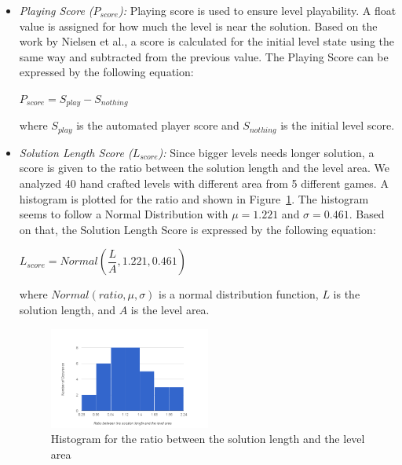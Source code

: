 \documentclass[letterpaper]{article}
\newcommand{\figref}[1]{Figure~\ref{Figure:#1}}
\begin{document}
\begin{itemize}
	\item \emph{Playing Score ($P_{score}$):} Playing score is used to ensure level playability. A float value is assigned for how much the level is near the solution. Based on the work by Nielsen et al.\cite{gvgpPerformanceProfiles}, a score is calculated for the initial level state using the same way and subtracted from the previous value. The Playing Score can be expressed by the following equation:
	\begin{center}$ P_{score} = S_{play} - S_{nothing}$\end{center}
	where $S_{play}$ is the automated player score and $S_{nothing}$ is the initial level score.
	
	\item\emph{Solution Length Score ($L_{score}$):} Since bigger levels needs longer solution, a score is given to the ratio between the solution length and the level area. We analyzed 40 hand crafted levels with different area from 5 different games. A histogram is plotted for the ratio and shown in \figref{solutionLengthHistogram}. The histogram seems to follow a Normal Distribution with $\mu = 1.221$ and $\sigma = 0.461$. Based on that, the Solution Length Score is expressed by the following equation:
	\begin{center}$L_{score} = Normal(\dfrac{L}{A}, 1.221, 0.461)$\end{center}
	where $Normal(ratio, \mu, \sigma)$ is a normal distribution function, $L$ is the solution length, and $A$ is the level area.
	\begin{figure}
		\centering
		\includegraphics[width=0.5\textwidth]{Images/solutionLengthHistogram}
		\caption{Histogram for the ratio between the solution length and the level area}
		\label{Figure:solutionLengthHistogram}
	\end{figure}
	

\end{itemize}
\end{document}
